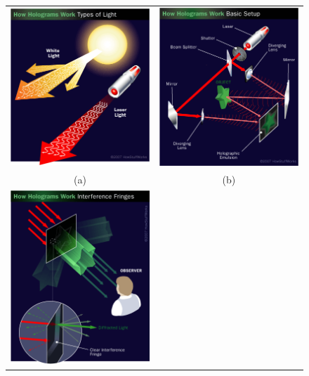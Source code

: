 

\begin{figure}
\centering
\begin{tabular}{cc}
\includegraphics[width=0.45\linewidth,keepaspectratio=true]{figs/hologram01.png}&
\includegraphics[width=0.45\linewidth,keepaspectratio=true]{figs/hologram02.png}\\
(a)&(b)\\
\includegraphics[width=0.45\linewidth,keepaspectratio=true]{figs/hologram03.png}&

\end{tabular}
\end{figure}
